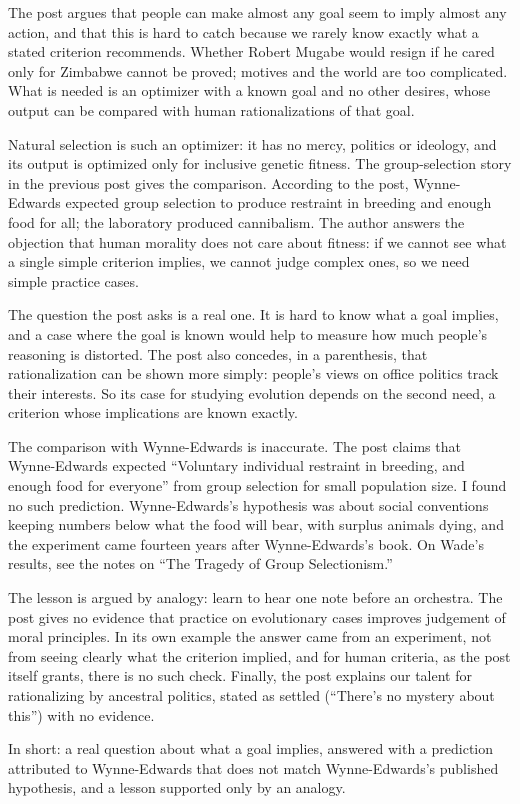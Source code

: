 \begin{afterword}
\summaryhead

The post argues that people can make almost any goal seem to imply almost any action, and that this is hard to catch because we rarely know exactly what a stated criterion recommends. Whether Robert Mugabe would resign if he cared only for Zimbabwe cannot be proved; motives and the world are too complicated. What is needed is an optimizer with a known goal and no other desires, whose output can be compared with human rationalizations of that goal.

Natural selection is such an optimizer: it has no mercy, politics or ideology, and its output is optimized only for inclusive genetic fitness. The group-selection story in the previous post gives the comparison. According to the post, Wynne-Edwards expected group selection to produce restraint in breeding and enough food for all; the laboratory produced cannibalism. The author answers the objection that human morality does not care about fitness: if we cannot see what a single simple criterion implies, we cannot judge complex ones, so we need simple practice cases.

\responsehead

The question the post asks is a real one. It is hard to know what a goal implies, and a case where the goal is known would help to measure how much people's reasoning is distorted. The post also concedes, in a parenthesis, that rationalization can be shown more simply: people's views on office politics track their interests. So its case for studying evolution depends on the second need, a criterion whose implications are known exactly.

The comparison with Wynne-Edwards is inaccurate. The post claims that Wynne-Edwards expected ``Voluntary individual restraint in breeding, and enough food for everyone'' from group selection for small population size. I found no such prediction. Wynne-Edwards's hypothesis was about social conventions keeping numbers below what the food will bear, with surplus animals dying, and the experiment came fourteen years after Wynne-Edwards's book. On Wade's results, see the notes on ``The Tragedy of Group Selectionism.''

The lesson is argued by analogy: learn to hear one note before an orchestra. The post gives no evidence that practice on evolutionary cases improves judgement of moral principles. In its own example the answer came from an experiment, not from seeing clearly what the criterion implied, and for human criteria, as the post itself grants, there is no such check. Finally, the post explains our talent for rationalizing by ancestral politics, stated as settled (``There's no mystery about this'') with no evidence.

In short: a real question about what a goal implies, answered with a prediction attributed to Wynne-Edwards that does not match Wynne-Edwards's published hypothesis, and a lesson supported only by an analogy.
\end{afterword}
